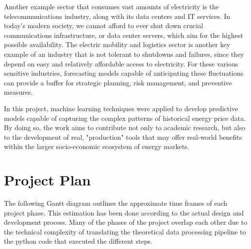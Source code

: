 \documentclass[12pt]{report} %
\begin{document}
Another example sector that consumes vast amounts of electricity is the telecommunications industry, along with its data centers and IT services. In today's modern society, we cannot afford to ever shut down crucial communications infrastructure, or data center servers, which aim for the highest possible availability.
The electric mobility and logistics sector is another key example of an industry that is not tolerant to shutdowns and failures, since they depend on easy and relatively affordable access to electricity. For these various sensitive industries, forecasting models capable of anticipating these fluctuations can provide a buffer for strategic planning, risk management, and preventive measures.

In this project, machine learning techniques were applied to develop predictive models capable of capturing the complex patterns of historical energy price data. By doing so, the work aims to contribute not only to academic research, but also to the development of real, "production" tools that may offer real-world benefits within the larger socio-economic ecosystem of energy markets.


\section{Project Plan}
The following Gantt diagram outlines the approximate time frames of each project phase. This estimation has been done according to the actual design and development process. Many of the phases of the project overlap each other due to the technical complexity of translating the theoretical data processing pipeline to the python code that executed the different steps.
\end{document}

